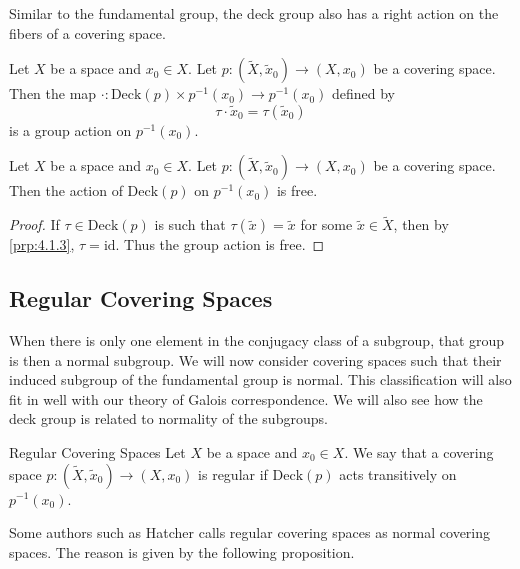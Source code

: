 \documentclass[a4paper]{article}
\begin{document}
Similar to the fundamental group, the deck group also has a right action on the fibers of a covering space. 

\begin{prp}{}{} Let $X$ be a space and $x_0\in X$. Let $p:(\tilde{X},\tilde{x}_0)\to(X,x_0)$ be a covering space. Then the map $\cdot:\text{Deck}(p)\times p^{-1}(x_0)\to p^{-1}(x_0)$ defined by $$\tau\cdot\tilde{x}_0=\tau(\tilde{x}_0)$$ is a group action on $p^{-1}(x_0)$. 
\end{prp}

\begin{prp}{}{} Let $X$ be a space and $x_0\in X$. Let $p:(\tilde{X},\tilde{x}_0)\to(X,x_0)$ be a covering space. Then the action of $\text{Deck}(p)$ on $p^{-1}(x_0)$ is free. \tcbline
\begin{proof}
If $\tau\in\text{Deck}(p)$ is such that $\tau(\tilde{x})=\tilde{x}$ for some $\tilde{x}\in\tilde{X}$, then by \ref{prp:4.1.3}, $\tau=\text{id}$. Thus the group action is free. 
\end{proof}
\end{prp}

\subsection{Regular Covering Spaces}
When there is only one element in the conjugacy class of a subgroup, that group is then a normal subgroup. We will now consider covering spaces such that their induced subgroup of the fundamental group is normal. This classification will also fit in well with our theory of Galois correspondence. We will also see how the deck group is related to normality of the subgroups. 

\begin{defn}{Regular Covering Spaces}{} Let $X$ be a space and $x_0\in X$. We say that a covering space $p:(\tilde{X},\tilde{x}_0)\to(X,x_0)$ is regular if $\text{Deck}(p)$ acts transitively on $p^{-1}(x_0)$. 
\end{defn}

Some authors such as Hatcher calls regular covering spaces as normal covering spaces. The reason is given by the following proposition. 
\end{document}
